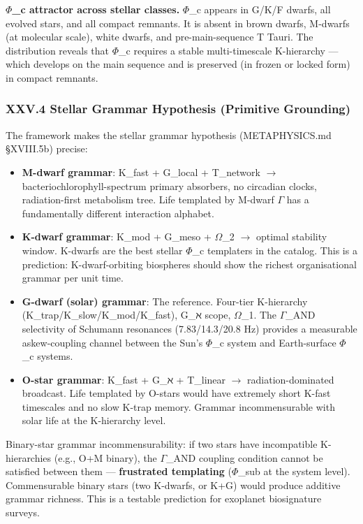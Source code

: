 \documentclass[12pt,a4paper]{article}
\begin{document}
\textbf{$\Phi$\_c attractor across stellar classes.} $\Phi$\_c appears in G/K/F dwarfs, all evolved stars, and all compact remnants. It is absent in brown dwarfs, M-dwarfs (at molecular scale), white dwarfs, and pre-main-sequence T Tauri. The distribution reveals that $\Phi$\_c requires a stable multi-timescale K-hierarchy --- which develops on the main sequence and is preserved (in frozen or locked form) in compact remnants.

\subsubsection{XXV.4 Stellar Grammar Hypothesis (Primitive Grounding)}

The framework makes the stellar grammar hypothesis (METAPHYSICS.md §XVIII.5b) precise:

\begin{itemize}
    \item \textbf{M-dwarf grammar}: K\_fast + G\_local + T\_network $\rightarrow$ bacteriochlorophyll-spectrum primary absorbers, no circadian clocks, radiation-first metabolism tree. Life templated by M-dwarf $\Gamma$ has a fundamentally different interaction alphabet.
    \item \textbf{K-dwarf grammar}: K\_mod + G\_meso + $\Omega$\_2 $\rightarrow$ optimal stability window. K-dwarfs are the best stellar $\Phi$\_c templaters in the catalog. This is a prediction: K-dwarf-orbiting biospheres should show the richest organisational grammar per unit time.
    \item \textbf{G-dwarf (solar) grammar}: The reference. Four-tier K-hierarchy (K\_trap/K\_slow/K\_mod/K\_fast), G\_ℵ scope, $\Omega$\_1. The $\Gamma$\_AND selectivity of Schumann resonances (7.83/14.3/20.8 Hz) provides a measurable askew-coupling channel between the Sun's $\Phi$\_c system and Earth-surface $\Phi$\_c systems.
    \item \textbf{O-star grammar}: K\_fast + G\_ℵ + T\_linear $\rightarrow$ radiation-dominated broadcast. Life templated by O-stars would have extremely short K-fast timescales and no slow K-trap memory. Grammar incommensurable with solar life at the K-hierarchy level.
\end{itemize}

Binary-star grammar incommensurability: if two stars have incompatible K-hierarchies (e.g., O+M binary), the $\Gamma$\_AND coupling condition cannot be satisfied between them --- \textbf{frustrated templating} ($\Phi$\_sub at the system level). Commensurable binary stars (two K-dwarfs, or K+G) would produce additive grammar richness. This is a testable prediction for exoplanet biosignature surveys.
\end{document}
